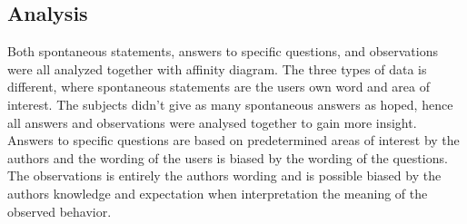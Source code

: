 \subsection{Analysis}
Both spontaneous statements, answers to specific questions, and observations were all analyzed together with affinity diagram. The three types of data is different, where spontaneous statements are the users own word and area of interest. The subjects didn't give as many spontaneous answers as hoped, hence all answers and observations were analysed together to gain more insight. Answers to specific questions are based on predetermined areas of interest by the authors and the wording of the users is biased by the wording of the questions. The observations is entirely the authors wording and is possible biased by the authors knowledge and expectation when interpretation the meaning of the observed behavior. 